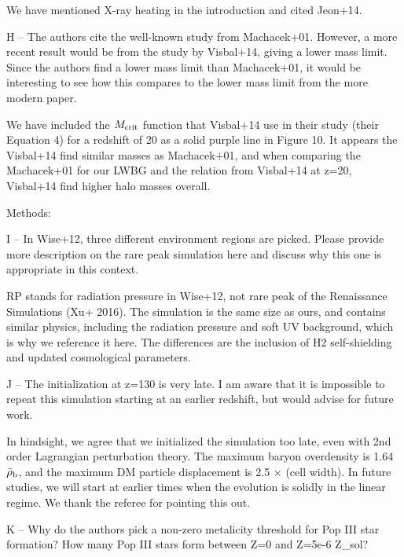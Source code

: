 \documentclass[11pt]{article}
\newenvironment{referee}[1][]{%
    \ignorespaces%
    \begin{mdframed}[style=myquotestyle,#1]%
}{%
    \end{mdframed}%
    \ignorespacesafterend%
}%
\begin{document}
We have mentioned X-ray heating in the introduction and cited Jeon+14.

\begin{referee}
H -- The authors cite the well-known study from Machacek+01. However, a more recent result would be from the study by Visbal+14, giving a lower mass limit. Since the authors find a lower mass limit than Machacek+01, it would be interesting to see how this compares to the lower mass limit from the more modern paper.
\end{referee}
We have included the $M_{\rm crit}$ function that Visbal+14 use in their study (their Equation 4) for a redshift of 20 as a solid purple line in Figure 10. It appears the Visbal+14 find similar masses as Machacek+01, and when comparing the Machacek+01 for our LWBG and the relation from Visbal+14 at z=20, Visbal+14 find higher halo masses overall.

\begin{referee}
Methods:

I -- In Wise+12, three different environment regions are picked. Please provide more description on the rare peak simulation here and discuss why this one is appropriate in this context.
\end{referee}


RP stands for radiation pressure in Wise+12, not rare peak of the Renaissance Simulations (Xu+ 2016). The simulation is the same size as ours, and contains similar physics, including the radiation pressure and soft UV background, which is why we reference it here. The differences are the inclusion of H2 self-shielding and updated cosmological parameters.
 
\begin{referee}
J -- The initialization at z=130 is very late. I am aware that it is impossible to repeat this simulation starting at an earlier redshift, but would advise for future work.
\end{referee}

In hindsight, we agree that we initialized the simulation too late, even with 2nd order Lagrangian perturbation theory.  The maximum baryon overdensity is 1.64$\bar{\rho}_{\rm b}$, and the maximum DM particle displacement is 2.5 $\times$ (cell width).  In future studies, we will start at earlier times when the evolution is solidly in the linear regime.  We thank the referee for pointing this out.

\begin{referee}
K -- Why do the authors pick a non-zero metalicity threshold for Pop III star formation? How many Pop III stars form between Z=0 and Z=5e-6 Z\_sol?
\end{referee}
\end{document}
